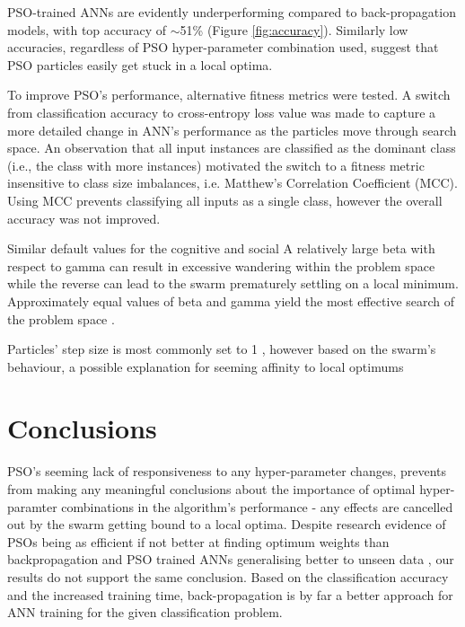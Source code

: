 \documentclass[12pt]{article}
\begin{document}
PSO-trained ANNs are evidently underperforming compared to back-propagation models, with top accuracy of $\sim$51\% (Figure \ref{fig:accuracy}). Similarly low accuracies, regardless of PSO hyper-parameter combination used, suggest that PSO particles easily get stuck in a local optima.

To improve PSO's performance, alternative fitness metrics were tested. A switch from classification accuracy to cross-entropy loss value was made to capture a more detailed change in ANN's performance as the particles move through search space.  An observation that all input instances are classified as the dominant class (i.e., the class with more instances) motivated the switch to a fitness metric insensitive to class size  imbalances, i.e. Matthew's Correlation Coefficient (MCC). Using MCC prevents classifying all inputs as a single class, however the overall accuracy was not improved. 

Similar default values for the cognitive and social  A relatively large beta with respect to gamma can result in excessive wandering within the problem space while the reverse  can lead to the swarm prematurely settling on a local minimum. Approximately equal values of beta and gamma yield the most effective search of the problem space \cite{Kennedy}.

Particles' step size is most commonly set to 1 \cite{Luke}, however based on the swarm's behaviour, a possible explanation for seeming affinity to local optimums

\vspace{-1.5em}
\section{Conclusions}
\vspace{-1.5em}

PSO's seeming lack of responsiveness to any hyper-parameter changes, prevents from making any meaningful conclusions about the importance of optimal hyper-paramter combinations in the algorithm's performance - any effects are cancelled out by the swarm getting bound to a local optima. Despite research evidence of PSOs being as efficient if not better at finding optimum weights than backpropagation and PSO trained ANNs generalising better to unseen data \cite{Kennedy}, our results do not support the same conclusion. Based on the classification accuracy and the increased training time, back-propagation is by far a better approach for ANN training for the given classification problem.
\end{document}
